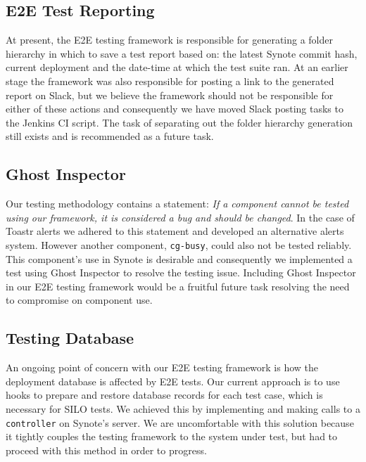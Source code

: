\subsection{E2E Test Reporting}
\label{subsec:e2e-test-reporting}

At present, the E2E testing framework is responsible for generating a folder hierarchy  in which to save a test report based on: the latest Synote commit hash, current deployment and the date-time at which the test suite ran. At an earlier stage the framework was also responsible for posting a link to the generated report on Slack, but we believe the framework should not be responsible for either of these actions and consequently we have moved Slack posting tasks to the Jenkins CI script. The task of separating out the folder hierarchy generation still exists and is recommended as a future task.

\subsection{Ghost Inspector}
\label{subsec:ghost-inspector}

Our testing methodology contains a statement: \textit{If a component cannot be tested using our framework, it is considered a bug and should be changed}. In the case of Toastr alerts we adhered to this statement and developed an alternative alerts system. However another component, \texttt{cg-busy}, could also not be tested reliably. This component's use in Synote is desirable and consequently we implemented a test using Ghost Inspector to resolve the testing issue. Including Ghost Inspector in our E2E testing framework would be a fruitful future task resolving the need to compromise on component use.

\subsection{Testing Database}
\label{subsec:testing-database}

An ongoing point of concern with our E2E testing framework is how the deployment database is affected by E2E tests. Our current approach is to use hooks to prepare and restore database records for each test case, which is necessary for SILO tests. We achieved this by implementing and making calls to a \texttt{controller} on Synote's server. We are uncomfortable with this solution because it tightly couples the testing framework to the system under test, but had to proceed with this method in order to progress.\\


